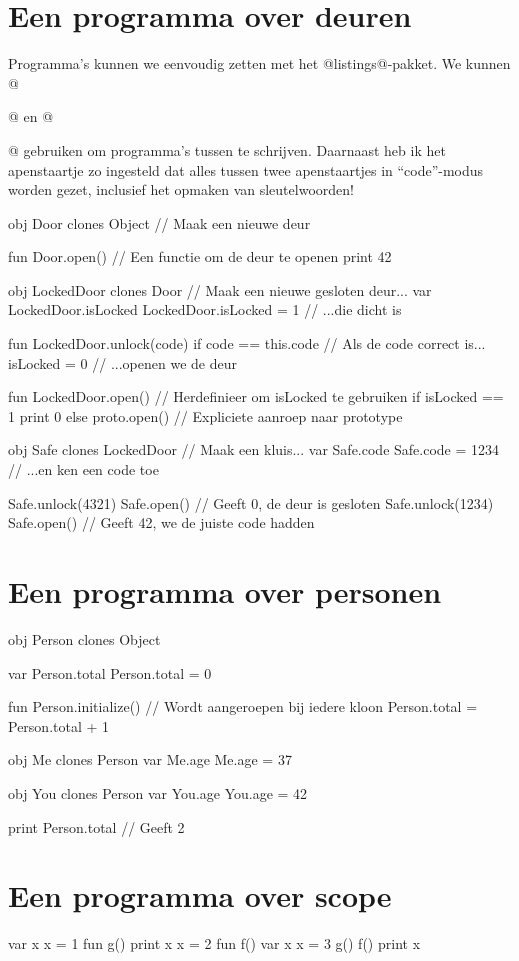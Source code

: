 \section{Een programma over deuren}

Programma's kunnen we eenvoudig zetten met het @listings@-pakket. We kunnen @\begin{program}@ en @\end{program}@ gebruiken om programma's tussen te schrijven. Daarnaast heb ik het apenstaartje zo ingesteld dat alles tussen twee apenstaartjes in ``code''-modus worden gezet, inclusief het opmaken van sleutelwoorden!

\begin{program}
obj Door clones Object       // Maak een nieuwe deur

fun Door.open()              // Een functie om de deur te openen
    print 42

obj LockedDoor clones Door   // Maak een nieuwe gesloten deur...
var LockedDoor.isLocked
LockedDoor.isLocked = 1      // ...die dicht is

fun LockedDoor.unlock(code)
    if code == this.code     // Als de code correct is...
        isLocked = 0         // ...openen we de deur

fun LockedDoor.open()        // Herdefinieer om isLocked te gebruiken
    if isLocked == 1
        print 0
    else
        proto.open()         // Expliciete aanroep naar prototype

obj Safe clones LockedDoor   // Maak een kluis...
var Safe.code
Safe.code = 1234             // ...en ken een code toe

Safe.unlock(4321)
Safe.open()                  // Geeft 0, de deur is gesloten
Safe.unlock(1234)
Safe.open()                  // Geeft 42, we de juiste code hadden
\end{program}

\section{Een programma over personen}

\begin{program}
obj Person clones Object

var Person.total
Person.total = 0

fun Person.initialize()      // Wordt aangeroepen bij iedere kloon
    Person.total = Person.total + 1

obj Me clones Person
var Me.age
Me.age = 37

obj You clones Person
var You.age
You.age = 42

print Person.total           // Geeft 2
\end{program}

\section{Een programma over scope}

\begin{program}
var x
x = 1
fun g()
    print x
    x = 2
fun f()
    var x
    x = 3
    g()
f()
print x
\end{program}

